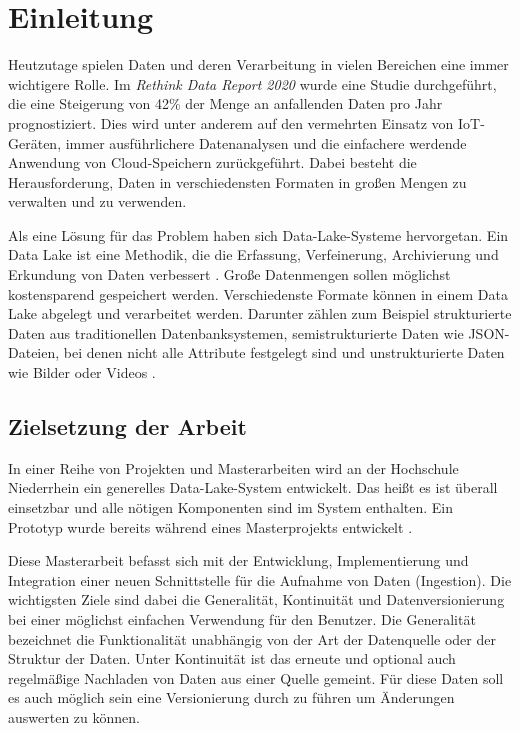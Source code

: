 \chapter{Einleitung}

Heutzutage spielen Daten und deren Verarbeitung in vielen Bereichen eine immer wichtigere Rolle.
Im \textit{Rethink Data Report 2020} \textcite{rethink_data_2020} wurde eine Studie durchgeführt, die eine Steigerung von 42\% der Menge an anfallenden Daten pro Jahr prognostiziert.
Dies wird unter anderem auf den vermehrten Einsatz von IoT-Geräten, immer ausführlichere Datenanalysen und die einfachere werdende Anwendung von Cloud-Speichern zurückgeführt.
Dabei besteht die Herausforderung, Daten in verschiedensten Formaten in großen Mengen zu verwalten und zu verwenden.

Als eine Lösung für das Problem haben sich Data-Lake-Systeme hervorgetan.
Ein Data Lake ist eine Methodik, die die Erfassung, Verfeinerung, Archivierung und Erkundung von Daten verbessert \parencite{datalake_01}.
Große Datenmengen sollen möglichst kostensparend gespeichert werden.
Verschiedenste Formate können in einem Data Lake abgelegt und verarbeitet werden.
Darunter zählen zum Beispiel strukturierte Daten aus traditionellen Datenbanksystemen, semistrukturierte Daten wie JSON-Dateien, bei denen nicht alle Attribute festgelegt sind und unstrukturierte Daten wie Bilder oder Videos \parencite{datalake_02}.


\section{Zielsetzung der Arbeit}

In einer Reihe von Projekten und Masterarbeiten wird an der Hochschule Niederrhein ein generelles Data-Lake-System entwickelt.
Das heißt es ist überall einsetzbar und alle nötigen Komponenten sind im System enthalten.
Ein Prototyp wurde bereits während eines Masterprojekts entwickelt \parencite{prototyp}.

Diese Masterarbeit befasst sich mit der Entwicklung, Implementierung und Integration einer neuen Schnittstelle für die Aufnahme von Daten (Ingestion).
Die wichtigsten Ziele sind dabei die Generalität, Kontinuität und Datenversionierung bei einer möglichst einfachen Verwendung für den Benutzer.
Die Generalität bezeichnet die Funktionalität unabhängig von der Art der Datenquelle oder der Struktur der Daten.
Unter Kontinuität ist das erneute und optional auch regelmäßige Nachladen von Daten aus einer Quelle gemeint.
Für diese Daten soll es auch möglich sein eine Versionierung durch zu führen um Änderungen auswerten zu können.

